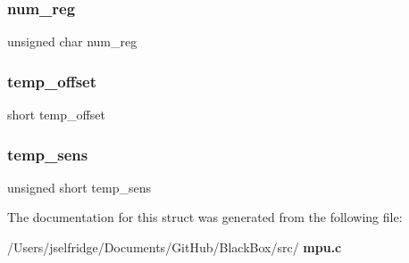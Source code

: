 \mbox{\label{structhw__s_a0c4fc172c338358ef1754c16c627eb08}} 
\subsubsection{num\+\_\+reg}
{\footnotesize\ttfamily unsigned char num\+\_\+reg}

\mbox{\label{structhw__s_ac3cd6878189d0ca0cb389c5ab11c8395}} 
\subsubsection{temp\+\_\+offset}
{\footnotesize\ttfamily short temp\+\_\+offset}

\mbox{\label{structhw__s_ab73e7066167ecd424b3a619cddd0939a}} 
\subsubsection{temp\+\_\+sens}
{\footnotesize\ttfamily unsigned short temp\+\_\+sens}



The documentation for this struct was generated from the following file\+:\begin{DoxyCompactItemize}
\item 
/\+Users/jselfridge/\+Documents/\+Git\+Hub/\+Black\+Box/src/\textbf{ mpu.\+c}\end{DoxyCompactItemize}
